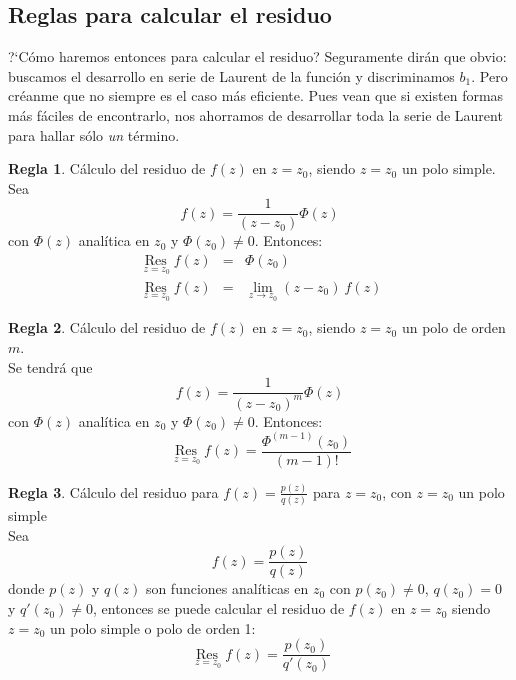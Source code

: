 \documentclass[12pt]{article}
\theoremstyle{definition}
\theoremstyle{theorem}
\theoremstyle{corolary}
\theoremstyle{method}
\newtheorem{method}{Regla}
\DeclareMathOperator*{\Res}{Res}
\begin{document}
\subsection{Reglas para calcular el residuo}
?`C\'omo haremos entonces para calcular el residuo? Seguramente dir\'an que obvio: buscamos el desarrollo en serie de Laurent de la funci\'on y discriminamos $b_1$. Pero cr\'eanme que no siempre es el caso m\'as eficiente. Pues vean que si existen formas m\'as f\'aciles de encontrarlo, nos ahorramos de desarrollar toda la serie de Laurent para hallar s\'olo \textit{un} t\'ermino.\\

\colorbox{magenta!40!white!80}{\parbox{\linewidth}{
\theoremstyle{method}
\begin{method}{C\'alculo del residuo de $f(z)$ en $z=z_0$, siendo  $z=z_0$ un polo simple.}\\

Sea $$f(z) = \frac{1}{(z-z_0)}\Phi(z)$$ con $\Phi(z)$ anal\'itica en $z_0$ y $\Phi(z_0)\neq 0$. Entonces:
\begin{eqnarray*}
\Res\limits_{\ z=z_0}f(z) &=& \Phi(z_0)\\
\Res\limits_{\ z=z_0}f(z)&=&\lim\limits_{z\to z_0}(z-z_0)\ f(z)
\end{eqnarray*}
\end{method}}}
\linebreak
\linebreak

\colorbox{magenta!40!white!80}{\parbox{\linewidth}{
\theoremstyle{method}
\begin{method}{C\'alculo del residuo de $f(z)$ en $z=z_0$, siendo  $z=z_0$ un polo de orden $m$.}\\

Se tendr\'a que $$f(z)=\frac{1}{(z-z_0)^m}\Phi(z)$$
con $\Phi(z)$ anal\'itica en $z_0$ y $\Phi(z_0)\neq 0$. Entonces:
$$\Res\limits_{\ z=z_0}f(z)=\frac{\Phi^{(m-1)}(z_0)}{(m-1)!}$$
\end{method}}}
\linebreak
\linebreak

\colorbox{magenta!40!white!80}{\parbox{\linewidth}{
\theoremstyle{method}
\begin{method}{C\'alculo del residuo para $\displaystyle f(z)=\frac{p(z)}{q(z)}$ para $z=z_0$, con $z=z_0$ un polo simple\\

Sea $$f(z)=\frac{p(z)}{q(z)}$$ donde $p(z)$ y $q(z)$ son funciones anal\'iticas en $z_0$ con $p(z_0)\neq 0$, $q(z_0)=0$ y $q'(z_0)\neq 0$, entonces se puede calcular el residuo de $f(z)$ en $z=z_0$ siendo $z=z_0$ un polo simple o polo de orden 1:}
$$\Res\limits_{\ z=z_0}f(z)=\frac{p(z_0)}{q'(z_0)}$$
\end{method}}}
\linebreak
\linebreak
\end{document}

